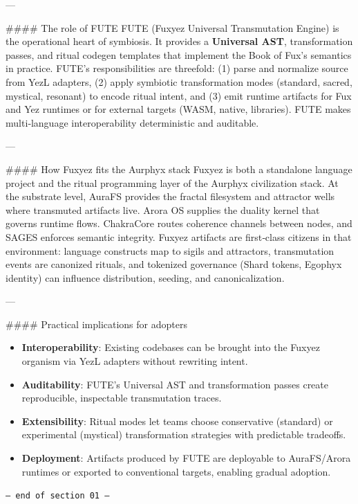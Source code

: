 \documentclass[12pt, a4paper]{book}
\begin{document}
---

\#\#\#\# The role of FUTE
FUTE (Fuxyez Universal Transmutation Engine) is the operational heart of symbiosis. It provides a \textbf{Universal AST}, transformation passes, and ritual codegen templates that implement the Book of Fux’s semantics in practice. FUTE’s responsibilities are threefold: (1) parse and normalize source from YezL adapters, (2) apply symbiotic transformation modes (standard, sacred, mystical, resonant) to encode ritual intent, and (3) emit runtime artifacts for Fux and Yez runtimes or for external targets (WASM, native, libraries). FUTE makes multi‑language interoperability deterministic and auditable.

---

\#\#\#\# How Fuxyez fits the Aurphyx stack
Fuxyez is both a standalone language project and the ritual programming layer of the Aurphyx civilization stack. At the substrate level, AuraFS provides the fractal filesystem and attractor wells where transmuted artifacts live. Arora OS supplies the duality kernel that governs runtime flows. ChakraCore routes coherence channels between nodes, and SAGES enforces semantic integrity. Fuxyez artifacts are first‑class citizens in that environment: language constructs map to sigils and attractors, transmutation events are canonized rituals, and tokenized governance (Shard tokens, Egophyx identity) can influence distribution, seeding, and canonicalization.

---

\#\#\#\# Practical implications for adopters
\begin{itemize}
  \item \textbf{Interoperability}: Existing codebases can be brought into the Fuxyez organism via YezL adapters without rewriting intent.  
  \item \textbf{Auditability}: FUTE’s Universal AST and transformation passes create reproducible, inspectable transmutation traces.  
  \item \textbf{Extensibility}: Ritual modes let teams choose conservative (standard) or experimental (mystical) transformation strategies with predictable tradeoffs.  
  \item \textbf{Deployment}: Artifacts produced by FUTE are deployable to AuraFS/Arora runtimes or exported to conventional targets, enabling gradual adoption.
\end{itemize}
    
    \vspace{1cm}
    \begin{center}
    \color{alienPurple}\texttt{--- end of section 01 ---}
    \end{center}
    \clearpage
    
\end{document}
